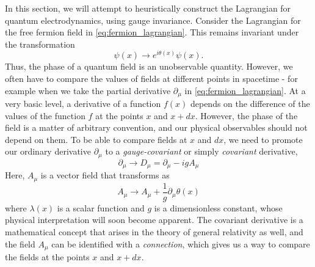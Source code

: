 In this section, we will attempt to heuristically construct the Lagrangian for quantum electrodynamics, using gauge invariance. Consider the Lagrangian for the free fermion field in \autoref{eq:fermion_lagrangian}. This remains invariant under the transformation 
\begin{equation}\label{eq:fermion_field_transformation}
  \psi(x)\rightarrow e^{i\theta(x)}\psi(x).
\end{equation}
Thus, the phase of a quantum field is an unobservable quantity. However, we often have to compare the values of fields at different points in spacetime - for example when we take the partial derivative $\partial_\mu$ in \autoref{eq:fermion_lagrangian}. At a very basic level, a derivative of a function $f(x)$ depends on the difference of the values of the function $f$ at the points $x$ and $x + dx$. However, the phase of the field is a matter of arbitrary convention, and our physical observables should not depend on them. To be able to compare fields at $x$ and $dx$, we need to promote our ordinary derivative $\partial_\mu$ to a \emph{gauge-covariant} or simply \emph{covariant} derivative,
$$\partial_\mu \rightarrow D_\mu = \partial_\mu - igA_\mu$$
Here, $A_\mu$ is a vector field that transforms as%
%
$$A_\mu\rightarrow A_\mu + \frac{1}{g}\partial_\mu\theta(x)$$
%
where $\lambda(x)$ is a scalar function and $g$ is a dimensionless constant, whose physical interpretation will soon become apparent. The covariant derivative is a mathematical concept that arises in the theory of general relativity as well, and the field $A_\mu$ can be identified with a \emph{connection}, which gives us a way to compare the fields at the points $x$ and $x + dx$.

